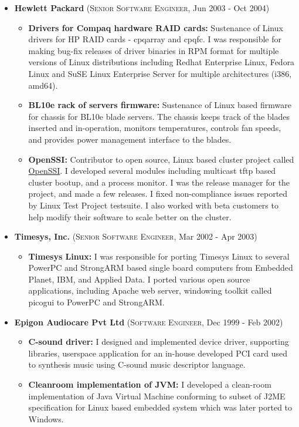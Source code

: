 \documentclass[11pt]{article}
\newcommand{\resitem}[2]{\item \textbf{#1:} #2}
\newcommand{\ressubheading}[3]{\item \textbf{#1} (\textsc{#2}, #3) }
\begin{document}
\begin{itemize}
  \ressubheading{Hewlett Packard}{Senior Software Engineer}{Jun 2003 - Oct 2004}
    \begin{itemize}

    \resitem{Drivers for Compaq hardware RAID cards}{Sustenance of Linux
    drivers for HP RAID cards - cpqarray and cpqfc. I was responsible for
    making bug-fix releases of driver binaries in RPM format for multiple
    versions of Linux distributions including Redhat Enterprise Linux, Fedora
    Linux and SuSE Linux Enterprise Server for multiple architectures (i386,
    amd64).}

    \resitem{BL10e rack of servers firmware}{Sustenance of Linux based firmware
    for chassis for BL10e blade servers. The chassis keeps track of the blades
    inserted and in-operation, monitors temperatures, controls fan speeds, and
    provides power management interface to the blades.}

    \resitem{OpenSSI}{Contributor to open source, Linux based cluster project
    called \href{http://www.openssi.org}{OpenSSI}. I developed several modules
    including multicast tftp based cluster bootup, and a process monitor. I was
    the release manager for the project, and made a few releases. I fixed
    non-compliance issues reported by Linux Test Project testsuite. I also
    worked with beta customers to help modify their software to scale better on
    the cluster.}

    \end{itemize}

  \ressubheading{Timesys, Inc.}{Senior Software Engineer}{Mar 2002 - Apr 2003}
    \begin{itemize}

    \resitem{Timesys Linux}{I was responsible for porting Timesys Linux to
    several PowerPC and StrongARM based single board computers from Embedded
    Planet, IBM, and Applied Data. I ported various open source applications,
    including Apache web server, windowing toolkit called picogui to PowerPC
    and StrongARM.}

    \end{itemize}

  \ressubheading{Epigon Audiocare Pvt Ltd}{Software Engineer}{Dec 1999 - Feb 2002}
    \begin{itemize}

    \resitem{C-sound driver}{I designed and implemented device driver,
    supporting libraries, userspace application for an in-house developed PCI
    card used to synthesis music using C-sound music descriptor language.}

    \resitem{Cleanroom implementation of JVM}{I developed a clean-room
    implementation of Java Virtual Machine conforming to subset of J2ME
    specification for Linux based embedded system which was later ported to
    Windows.}

    \end{itemize}
\end{itemize}
\end{document}
